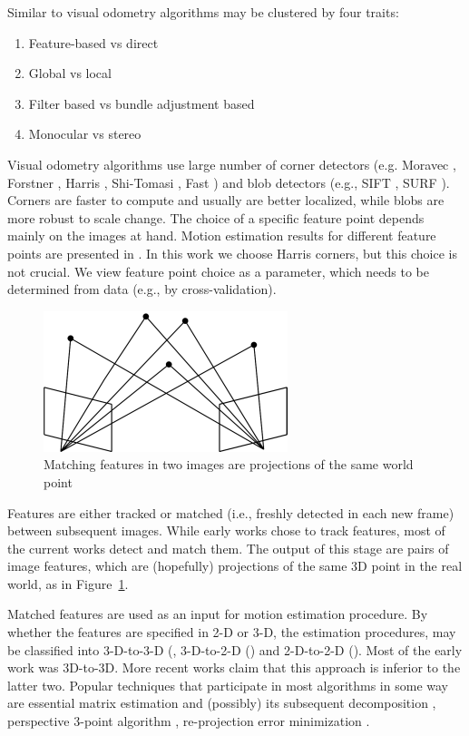 \documentclass[MSc,beforeExam]{iitcsthesis}
\begin{document}
Similar to \cite{Persson2015} visual odometry algorithms may be
clustered by four traits:
\begin{enumerate}
\item Feature-based vs direct
\item Global vs local
\item Filter based vs bundle adjustment based
\item Monocular vs stereo
\end{enumerate}

Visual odometry algorithms use large number of corner detectors
(e.g. Moravec \cite{Moravec1980}, Forstner \cite{Forstner}, Harris
\cite{Harris1987}, Shi-Tomasi \cite{Shi1994}, Fast \cite{Rosten2006})
and blob detectors (e.g., SIFT \cite{Lowe2004}, SURF
\cite{Bay2006}). Corners are faster to compute and usually are better
localized, while blobs are more robust to scale change. The choice of
a specific feature point depends mainly on the images at hand.  Motion
estimation results for different feature points are presented in
\cite{Govender2009}. In this work we choose Harris \cite{Harris1987}
corners, but this choice is not crucial. We view feature point choice
as a parameter, which needs to be determined from data (e.g., by
cross-validation).

\begin{figure}[h]
  \centering
\includegraphics{5ptm2}
\caption{Matching features in two images are projections of the same
  world point}
\label{fig:5ptm}
\end{figure}

Features are either tracked \cite{Hedborg2009} or matched
\cite{Geiger2011} (i.e., freshly detected in each new frame) between
subsequent images. While early works chose to track features, most of
the current works detect and match them. The output of this stage are
pairs of image features, which are (hopefully) projections of the same
3D point in the real world, as in Figure~\ref{fig:5ptm}.

Matched features are used as an input for motion estimation procedure.
By whether the features are specified in 2-D or 3-D, the estimation
procedures, may be classified into 3-D-to-3-D (\cite{Milella2006},
3-D-to-2-D (\cite{Geiger2011}) and 2-D-to-2-D
(\cite{Nister2004}). Most of the early work was 3D-to-3D.  More recent
works \cite{Nister2004} claim that this approach is inferior to the
latter two. Popular techniques that participate in most algorithms in
some way are essential matrix estimation and (possibly) its subsequent
decomposition \cite{Nister2004}, perspective 3-point algorithm
\cite{Kneip1991}, re-projection error minimization \cite{Geiger2011}.
\end{document}
